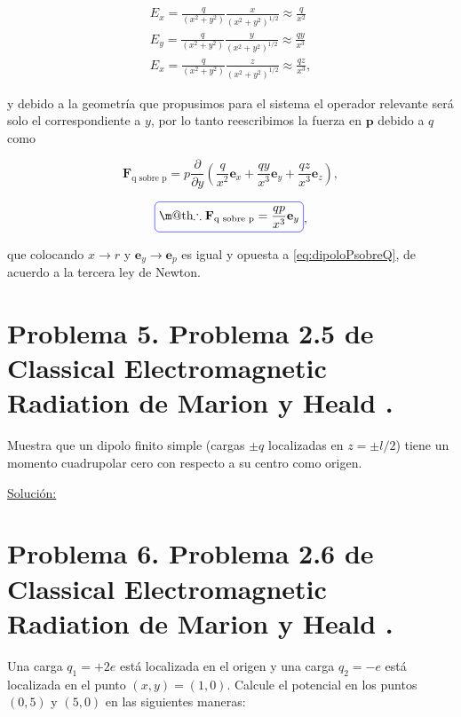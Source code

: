 \documentclass[a4paper,11pt]{article}
\makeatletter
\numberwithin{equation}{section}
\newcommand*{\boxcolor}{blue}
\renewcommand{\boxed}[1]{\textcolor{\boxcolor}{%
\tikz[baseline={([yshift=-1ex]current bounding box.center)}] \node [rectangle, minimum width=1ex,rounded corners,draw] {\normalcolor\m@th$\displaystyle#1$};}}
\makeatother
\begin{document}
\begin{align*}
 E_x = \frac{q}{(x^2+y^2)}\frac{x}{(x^2+y^2)^{1/2}} \approx \frac{q}{x^2} \\
 E_y = \frac{q}{(x^2+y^2)}\frac{y}{(x^2+y^2)^{1/2}} \approx \frac{qy}{x^3} \\
 E_x = \frac{q}{(x^2+y^2)}\frac{z}{(x^2+y^2)^{1/2}} \approx \frac{qz}{x^3},
\end{align*}

y debido a la geometría que propusimos para el sistema el operador relevante 
será solo el correspondiente a $y$, por lo tanto reescribimos la fuerza en 
$\mathbf{p}$ debido a $q$ como 

\begin{equation}
 \mathbf{F}_{\text{q sobre p}} = p\frac{\partial}{\partial y}\left( \frac{q}{x^2} 
 \mathbf{e}_x + \frac{qy}{x^3}\mathbf{e}_y + \frac{qz}{x^3}\mathbf{e}_z\right),
\end{equation}
 
\begin{equation}
 \boxed{\therefore  \mathbf{F}_{\text{q sobre p}} = \frac{qp}{x^3}\mathbf{e}_y},
\end{equation}

que colocando $x \rightarrow r$ y $\mathbf{e}_y \rightarrow \mathbf{e}_p$ es igual y 
opuesta a \eqref{eq:dipoloPsobreQ}, de acuerdo a la tercera ley de Newton.

\section{Problema 5. Problema 2.5 de Classical Electromagnetic Radiation
de Marion y Heald \cite{marion2}.}

Muestra que un dipolo finito simple (cargas $\pm q$ localizadas en $z = \pm l/2$) 
tiene un momento cuadrupolar cero con respecto a su centro como origen.

\vspace{.3cm}

\underline{Solución:} \vspace{.3cm}

\section{Problema 6. Problema 2.6 de Classical Electromagnetic Radiation
de Marion y Heald \cite{marion2}.}

Una carga $q_1 = + 2e$ está localizada en el origen y una carga $q_2 = - e$ está 
localizada en el punto $(x,y) = (1,0)$. Calcule el potencial en los puntos $(0,5)$
y $(5,0)$ en las siguientes maneras:
\end{document}

